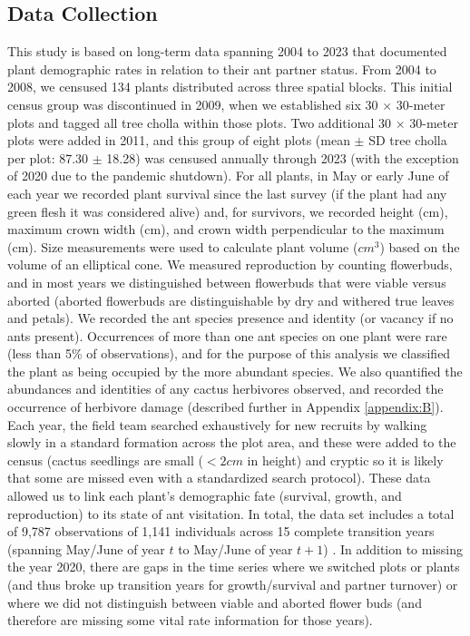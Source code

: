 \documentclass[11pt]{article}
\begin{document}
\subsection*{Data Collection}
This study is based on long-term data spanning 2004 to 2023 that documented plant demographic rates in relation to their ant partner status. 
From 2004 to 2008, we censused 134 plants distributed across three spatial blocks. 
This initial census group was discontinued in 2009, when we established six 30 $\times$ 30-meter plots and tagged all tree cholla within those plots. 
Two additional 30 $\times$ 30-meter plots were added in 2011, and this group of eight plots (mean $\pm$ SD tree cholla per plot: 87.30 $\pm$ 18.28) was censused annually through 2023 (with the exception of 2020 due to the pandemic shutdown).
For all plants, in May or early June of each year we recorded plant survival since the last survey (if the plant had any green flesh it was considered alive) and, for survivors, we recorded height (cm), maximum crown width (cm), and crown width perpendicular to the maximum (cm).
Size measurements were used to calculate plant volume ($cm^3$) based on the volume of an elliptical cone. 
We measured reproduction by counting flowerbuds, and in most years we distinguished between flowerbuds that were viable versus aborted (aborted flowerbuds are distinguishable by dry and withered true leaves and petals). 
We recorded the ant species presence and identity (or vacancy if no ants present).
Occurrences of more than one ant species on one plant were rare (less than 5\% of observations), and for the purpose of this analysis we classified the plant as being occupied by the more abundant species. 
We also quantified the abundances and identities of any cactus herbivores observed, and recorded the occurrence of herbivore damage (described further in Appendix \ref{appendix:B}). 
Each year, the field team searched exhaustively for new recruits by walking slowly in a standard formation across the plot area, and these were added to the census (cactus seedlings are small ($<2 cm$ in height) and cryptic so it is likely that some are missed even with a standardized search protocol). 
These data allowed us to link each plant's demographic fate (survival, growth, and reproduction) to its state of ant visitation. 
In total, the data set includes a total of 9,787 observations of 1,141 individuals across 15 complete transition years (spanning May/June of year $t$ to May/June of year $t+1$) \citep{DataCholla}. 
In addition to missing the year 2020, there are gaps in the time series where we switched plots or plants (and thus broke up transition years for growth/survival and partner turnover) or where we did not distinguish between viable and aborted flower buds (and therefore are missing some vital rate information for those years).
\end{document}
